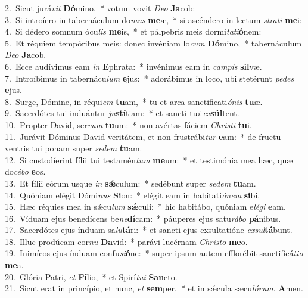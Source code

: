 {2.~}Sicut jurá\textit{vit} \textbf{Dó}mino,~* votum vovit \textit{De}\textit{o} \textbf{Ja}cob:\\
{3.~}Si introíero in tabernáculum do\textit{mus} \textbf{me}æ,~* si ascéndero in lectum \textit{stra}\textit{ti} \textbf{me}i:\\
{4.~}Si dédero somnum ócu\textit{lis} \textbf{me}is,~* et pálpebris meis dormi\textit{ta}\textit{ti}\textbf{ó}nem:\\
{5.~}Et réquiem tempóribus meis: donec invéniam lo\textit{cum} \textbf{Dó}mino,~* tabernáculum \textit{De}\textit{o} \textbf{Ja}cob.\\
{6.~}Ecce audívimus eam \textit{in} \textbf{E}phrata:~* invénimus eam in \textit{cam}\textit{pis} \textbf{sil}væ.\\
{7.~}Introíbimus in tabernácu\textit{lum} \textbf{e}jus:~* adorábimus in loco, ubi stetérunt \textit{pe}\textit{des} \textbf{e}jus.\\
{8.~}Surge, Dómine, in réqui\textit{em} \textbf{tu}am,~* tu et arca sanctificati\textit{ó}\textit{nis} \textbf{tu}æ.\\
{9.~}Sacerdótes tui induántur \textit{ju}\textbf{stí}tiam:~* et sancti tu\textit{i} \textit{ex}\textbf{súl}tent.\\
{10.~}Propter David, ser\textit{vum} \textbf{tu}um:~* non avértas fáciem \textit{Chri}\textit{sti} \textbf{tu}i.\\
{11.~}Jurávit Dóminus David veritátem, et non frustrábi\textit{tur} \textbf{e}am:~* de fructu ventris tui ponam super \textit{se}\textit{dem} \textbf{tu}am.\\
{12.~}Si custodíerint fílii tui testamén\textit{tum} \textbf{me}um:~* et testimónia mea hæc, quæ do\textit{cé}\textit{bo} \textbf{e}os.\\
{13.~}Et fílii eórum usque \textit{in} \textbf{sǽ}culum:~* sedébunt super \textit{se}\textit{dem} \textbf{tu}am.\\
{14.~}Quóniam elégit Dómi\textit{nus} \textbf{Si}on:~* elégit eam in habitati\textit{ó}\textit{nem} \textbf{si}bi.\\
{15.~}Hæc réquies mea in sǽcu\textit{lum} \textbf{sǽ}culi:~* hic habitábo, quóniam e\textit{lé}\textit{gi} \textbf{e}am.\\
{16.~}Víduam ejus benedícens be\textit{ne}\textbf{dí}cam:~* páuperes ejus satu\textit{rá}\textit{bo} \textbf{pá}nibus.\\
{17.~}Sacerdótes ejus índuam sa\textit{lu}\textbf{tá}ri:~* et sancti ejus exsultatióne \textit{ex}\textit{sul}\textbf{tá}bunt.\\
{18.~}Illuc prodúcam cor\textit{nu} \textbf{Da}vid:~* parávi lucérnam \textit{Chri}\textit{sto} \textbf{me}o.\\
{19.~}Inimícos ejus índuam confu\textit{si}\textbf{ó}ne:~* super ipsum autem efflorébit sanctificá\textit{ti}\textit{o} \textbf{me}a.\\
{20.~}Glória Patri, \textit{et} \textbf{Fí}lio,~* et Spirí\textit{tu}\textit{i} \textbf{San}cto.\\
{21.~}Sicut erat in princípio, et nunc, \textit{et} \textbf{sem}per,~* et in sǽcula sæcu\textit{ló}\textit{rum}. \textbf{A}men.\\
